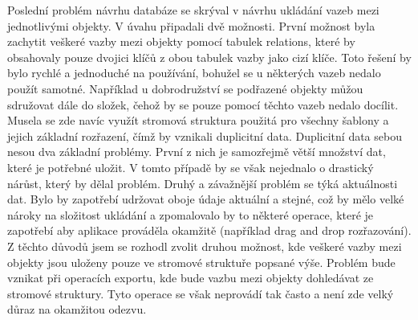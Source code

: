 \documentclass[thesis=B,czech]{resources/FITthesis}[2012/06/26]
\begin{document}
Poslední problém návrhu databáze se skrýval v návrhu ukládání vazeb mezi jednotlivými objekty. V úvahu připadali dvě možnosti. První možnost byla zachytit veškeré vazby mezi objekty pomocí tabulek \clqq relations\crqq , které by obsahovaly pouze dvojici klíčů z obou tabulek vazby jako cizí klíče. Toto řešení by bylo rychlé a jednoduché na používání, bohužel se u některých vazeb nedalo použít samotné. Například u dobrodružství se podřazené objekty můžou sdružovat dále do složek, čehož by se pouze pomocí těchto vazeb nedalo docílit. Musela se zde navíc využít stromová struktura použitá pro všechny šablony a jejich základní rozřazení, čímž by vznikali duplicitní data. Duplicitní data sebou nesou dva základní problémy. První z nich je samozřejmě větší množství dat, které je potřebné uložit. V tomto případě by se však nejednalo o drastický nárůst, který by dělal problém. Druhý a závažnější problém se týká aktuálnosti dat. Bylo by zapotřebí udržovat oboje údaje aktuální a stejné, což by mělo velké nároky na složitost ukládání a zpomalovalo by to některé operace, které je zapotřebí aby aplikace prováděla okamžitě (například drag and drop rozřazování). Z těchto důvodů jsem se rozhodl zvolit druhou možnost, kde veškeré vazby mezi objekty jsou uloženy pouze ve stromové struktuře popsané výše. Problém bude vznikat při operacích exportu, kde bude vazbu mezi objekty dohledávat ze stromové struktury. Tyto operace se však neprovádí tak často a není zde velký důraz na okamžitou odezvu. 
\end{document}

